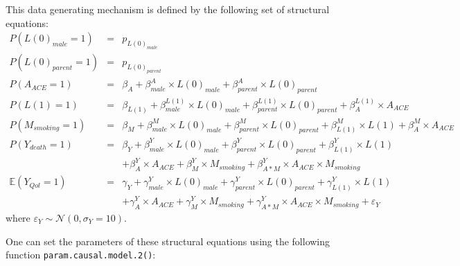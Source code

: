 \documentclass[
]{book}
\begin{document}
This data generating mechanism is defined by the following set of structural equations:
\[\begin{array}{lll}
P(L(0)_{male} = 1) &=& p_{L(0)_{male}}\\
P(L(0)_{parent} = 1) &=& p_{L(0)_{parent}}\\
P(A_{ACE} = 1) &=& \beta_{A} + \beta_{male}^A \times L(0)_{male} + \beta_{parent}^A \times L(0)_{parent}\\
P(L(1) = 1) &=& \beta_{L(1)} + \beta_{male}^{L(1)} \times L(0)_{male} + \beta_{parent}^{L(1)} \times L(0)_{parent} + \beta_{A}^{L(1)} \times A_{ACE}\\
P(M_{smoking} = 1) &=& \beta_{M} + \beta_{male}^M \times L(0)_{male} + \beta_{parent}^M \times L(0)_{parent} + \beta_{L(1)}^M \times L(1) + \beta_{A}^M \times A_{ACE}\\
P(Y_{death} = 1) &=& \beta_{Y} + \beta_{male}^Y \times L(0)_{male} + \beta_{parent}^Y \times L(0)_{parent} + \beta_{L(1)}^Y \times L(1)\\
                 & & + \beta_{A}^Y \times A_{ACE} + \beta_{M}^Y \times M_{smoking} + \beta_{A \ast M }^Y \times A_{ACE} \times M_{smoking}\\
\mathbb{E}(Y_{Qol} = 1) &=& \gamma_{Y} + \gamma_{male}^Y \times L(0)_{male} + \gamma_{parent}^Y \times L(0)_{parent} + \gamma_{L(1)}^Y \times L(1)\\
                        & &+ \gamma_{A}^Y \times A_{ACE} + \gamma_{M}^Y \times M_{smoking} + \gamma_{A \ast M }^Y \times A_{ACE} \times M_{smoking} + \varepsilon_Y
\end{array}\]
where \(\varepsilon_Y \sim \mathcal{N}(0,\sigma_Y = 10)\).

One can set the parameters of these structural equations using the following function \texttt{param.causal.model.2()}:
\end{document}
